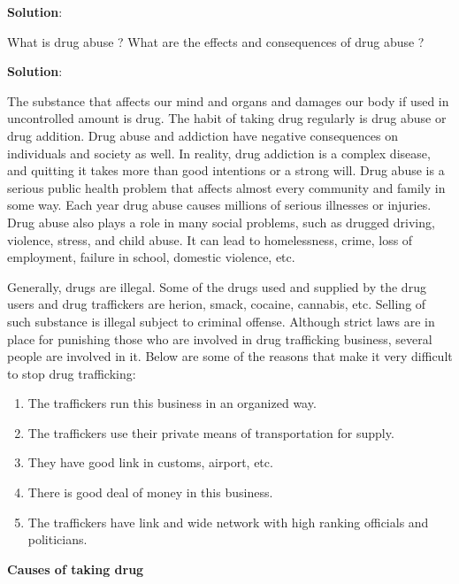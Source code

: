 \documentclass[
]{book}
\newcommand{\question}{\item}
\newenvironment{solution}{ {\bfseries Solution}:}{}
\begin{document}
\begin{questions}
\begin{solution}
\end{solution}

\question What is drug abuse ? What are the effects and consequences of drug abuse ?

\begin{solution}

The substance that affects our mind and organs and damages our body if used in uncontrolled amount is drug. The habit of taking drug regularly is drug abuse or drug addition. Drug abuse and addiction have negative consequences on individuals and society as well. In reality, drug addiction is a complex disease, and quitting it takes more than good intentions or a strong will. Drug abuse is a serious public health problem that affects almost every community and family in some way. Each year drug abuse causes millions of serious illnesses or injuries. Drug abuse also plays a role in many social problems, such as drugged driving, violence, stress, and child abuse. It can lead to homelessness, crime, loss of employment, failure in school, domestic violence, etc.

Generally, drugs are illegal. Some of the drugs used and supplied by the drug users and drug traffickers are herion, smack, cocaine, cannabis, etc. Selling of such substance is illegal subject to criminal offense. Although strict laws are in place for punishing those who are involved in drug trafficking business, several people are involved in it. Below are some of the reasons that make it very difficult to stop drug trafficking:

\begin{enumerate}
\item The traffickers run this business in an organized way.
\item The traffickers use their private means of transportation for supply.
\item They have good link in customs, airport, etc.
\item There is good deal of money in this business.
\item The traffickers have link and wide network with high ranking officials and politicians.
\end{enumerate}

\textbf{Causes of taking drug}


\end{solution}
\end{questions}
\end{document}
